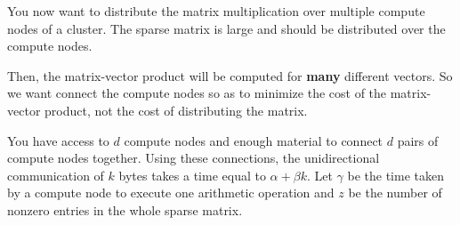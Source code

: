 \question{}

You now want to distribute the matrix multiplication over multiple compute nodes of a cluster.
The sparse matrix is large and should be distributed over the compute nodes.

Then, the matrix-vector product will be computed for \textbf{many} different vectors.
So we want connect the compute nodes so as to minimize the cost of the matrix-vector product,
not the cost of distributing the matrix.

You have access to $d$ compute nodes and enough material to connect $d$ pairs of compute nodes together.
Using these connections, the unidirectional communication of $k$ bytes takes a time
equal to $\alpha + \beta k$.
Let $\gamma$ be the time taken by a compute node to execute one arithmetic operation
and $z$ be the number of nonzero entries in the whole sparse matrix.

